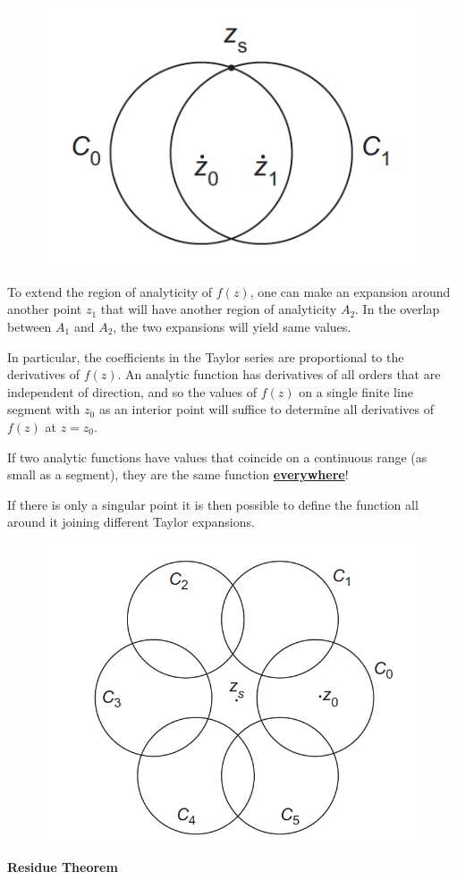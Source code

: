 \documentclass{article}
\begin{document}
\begin{figure}[h]
    \centering
    \includegraphics[width=0.4\linewidth]{fig28.png}
\end{figure}

\noindent
To extend the region of analyticity of $f(z)$, one can make an expansion around another point $z_1$ that will have another region of analyticity $A_2$. In the overlap between $A_1$ and $A_2$, the two expansions will yield same values.

\vspace{2mm}\noindent
In particular, the coefficients in the Taylor series are proportional to the derivatives of $f(z)$. An analytic function has derivatives of all orders that are independent of direction, and so the values of $f(z)$ on a single finite line segment with $z_0$ as an interior point will suffice to determine all derivatives of $f(z)$ at $z = z_0$.

\vspace{2mm}\noindent
If two analytic functions have values that coincide on a continuous range (as small as a segment), they are the same function \underline{\textbf{everywhere}}!

\newpage

\noindent
If there is only a singular point it is then possible to define the function all around it joining different Taylor expansions.

\begin{figure}[h]
    \centering
    \includegraphics[width=0.4\linewidth]{fig29.png}
\end{figure}

\noindent
\textbf{Residue Theorem}
\end{document}
